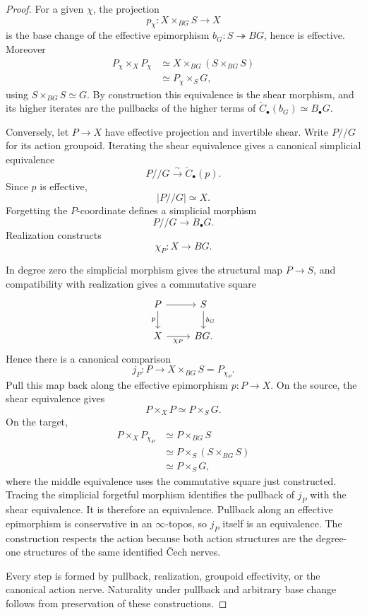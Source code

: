 \begin{proof}
For a given $\chi$, the projection
\[
    p_\chi:
    X\times_{BG}S\longrightarrow X
\]
is the base change of the effective epimorphism
$b_G:S\twoheadrightarrow BG$, hence is effective.  Moreover
\[
\begin{aligned}
    P_\chi\times_XP_\chi
    &\simeq
    X\times_{BG}(S\times_{BG}S)\\
    &\simeq
    P_\chi\times_SG,
\end{aligned}
\]
using
$S\times_{BG}S\simeq G$.  By construction this equivalence is the shear
morphism, and its higher iterates are the pullbacks of the higher terms of
$\check C_\bullet(b_G)\simeq B_\bullet G$.

Conversely, let $P\to X$ have effective projection and invertible shear.
Write $P/\!/G$ for its action groupoid.  Iterating the shear equivalence gives
a canonical simplicial equivalence
\[
    P/\!/G
    \xrightarrow{\sim}
    \check C_\bullet(p).
\]
Since $p$ is effective,
\[
    |P/\!/G|\simeq X.
\]
Forgetting the $P$-coordinate defines a simplicial morphism
\[
    P/\!/G\longrightarrow B_\bullet G.
\]
Realization constructs
\[
    \chi_P:X\longrightarrow BG.
\]

In degree zero the simplicial morphism gives the structural map $P\to S$,
and compatibility with realization gives a commutative square
\[
\begin{tikzcd}
P \arrow[r] \arrow[d,"p"'] & S \arrow[d,"b_G"]\\
X \arrow[r,"\chi_P"'] & BG.
\end{tikzcd}
\]
Hence there is a canonical comparison
\[
    j_P:
    P\longrightarrow
    X\times_{BG}S
    =
    P_{\chi_P}.
\]
Pull this map back along the effective epimorphism $p:P\to X$.  On the source,
the shear equivalence gives
\[
    P\times_XP
    \simeq
    P\times_SG.
\]
On the target,
\[
\begin{aligned}
    P\times_XP_{\chi_P}
    &\simeq
    P\times_{BG}S\\
    &\simeq
    P\times_S(S\times_{BG}S)\\
    &\simeq
    P\times_SG,
\end{aligned}
\]
where the middle equivalence uses the commutative square just constructed.
Tracing the simplicial forgetful morphism identifies the pullback of $j_P$
with the shear equivalence.  It is therefore an equivalence.  Pullback along
an effective epimorphism is conservative in an $\infty$-topos, so
$j_P$ itself is an equivalence.  The construction respects the action because
both action structures are the degree-one structures of the same identified
\v{C}ech nerves.

Every step is formed by pullback, realization, groupoid effectivity, or the
canonical action nerve.  Naturality under pullback and arbitrary base change
follows from preservation of these constructions.
\end{proof}

